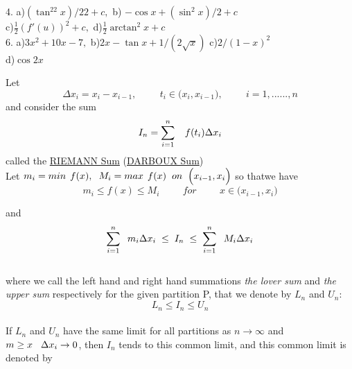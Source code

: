 \documentclass[11pt]{amsbook}
\begin{document}
	\medskip

	4. \quad a)$ (\tan^{22} x) / 22 +c,$   \quad  \quad  \quad  \quad    b) $ -\cos x +(\sin^2 x)/2 +c $ \\ 

	 \quad \quad  c)$ \frac{1}{2} (f'(u))^2 +c,$  \quad  \quad  \quad  \quad \quad \enskip    d)$ \frac{1}{2} \arctan^2x+c$ \\

	6. \quad a)$ 3x^2 + 10x - 7,$ \quad \quad \quad \quad \quad    b)$2x-\tan x +1/(2\sqrt x) $ \quad \quad c)$ 2/(1-x)^2$ \\

	\quad \quad d)$\cos 2x$

Let 
$$ \Delta x_i=x_i-x_{i-1}, \hspace{1cm} t_i \in
\Big( x_i, x_{i-1}  \Big), \hspace{1cm} i=1,......, n
$$
and consider the sum 
$$ I_n= \sum_{i=1}^{n} \hspace{.3cm} f(t_i)\Delta x_i $$
called the \underline{RIEMANN Sum} (\underline{DARBOUX Sum})\\

Let $m_i=min \hspace{.15cm}f(x),\hspace{.2cm} M_i= max \hspace{.15cm}f(x)\hspace{.2cm} on \hspace{.2cm}\Big( x_{i-1}, x_i \Big)$ 
\hspace{.2cm}so that\newline we have 
$$ 
m_i \leq f(x) \leq M_i \hspace{1cm}for\hspace{1cm}x \in \Big( x_{i-1}, x_i \Big)
$$

and 
$$
\sum_{i=1}^{n} \hspace{.2cm} m_i\Delta x_i \hspace{.1cm}\leq\hspace{.1cm} I_n\hspace{.1cm} \leq \hspace{.1cm} \sum_{i=1}^{n} \hspace{.2cm} M_i\Delta x_i
$$\\

where we call the left hand  and right hand summations \emph{the lover sum} and \emph{the upper sum} respectively for the given partition P, that we denote by $L_n$ and $U_n$: 
$$
L_n \leq I_n \leq U_n
$$\\
If $L_n$ and $U_n$ have the same limit for all partitions as $n\rightarrow\infty$ and $m\geq x \hspace{.3cm}\Delta x_i \rightarrow 0 $, then $I_n$ tends  to this common limit, and this common limit is denoted by\\
\end{document}
